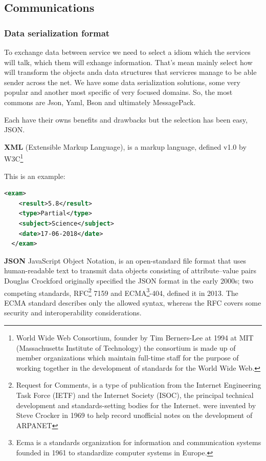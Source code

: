 \subsection{Communications}

\subsubsection{Data serialization format}


To exchange data between service we need to select a idiom which the services
will talk, which them will exhange information. That's mean mainly select how
will transform the objects anda data structures that servicres manage to be able
sender across the net.
We have some data serialization solutions, some very popular and another most
specific of very focused domains. So, the most commons are Json, Yaml,
Bson and ultimately MessagePack.

Each have their owns benefits and drawbacks but the selection has been easy, JSON.

\textbf{XML} (Extensible Markup Language), is a markup language, defined v1.0 by
W3C\footnote{World Wide Web Consortium, founder by Tim Berners-Lee at 1994 at MIT
(Massachusetts Institute of Technology) the consortium is made up of member
organizations which maintain full-time staff for the purpose of working together
in the development of standards for the World Wide Web.}

This is an example:
\begin{lstlisting}[language=xml,frame=none,numbers=none]
  <exam>
    <result>5.8</result>
    <type>Partial</type>
    <subject>Science</subject>
    <date>17-06-2018</date>
  </exam>
\end{lstlisting}

\textbf{JSON} JavaScript Object Notation, is an open-standard file format that uses
human-readable text to transmit data objects consisting of attribute–value pairs
Douglas Crockford originally specified the JSON format in the early 2000s;
two competing standards, RFC\footnote{ Request for Comments, is a type of
publication from the Internet Engineering Task Force (IETF) and the Internet
Society (ISOC), the principal technical development and standards-setting bodies
for the Internet. were invented by Steve Crocker in 1969 to help record
unofficial notes on the development of ARPANET} 7159 and ECMA\footnote{Ecma is a
standards organization for information and communication systems founded in 1961
to standardize computer systems in Europe.}-404, defined it in 2013.
The ECMA standard describes only the allowed syntax, whereas the RFC covers some
 security and interoperability considerations.

